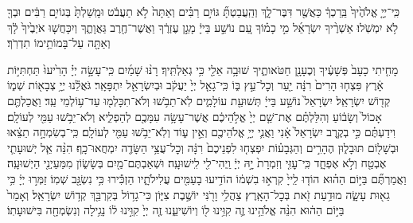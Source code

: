 \begin{footnotesize}
	כִּֽי־יְיָ֤ אֱלֹהֶ֙יךָ֙ בֵּֽרַכְךָ֔ כַּאֲשֶׁ֖ר דִּבֶּר־לָ֑ךְ וְהַֽעֲבַטְתָּ֞ גּוֹיִ֣ם רַבִּ֗ים וְאַתָּה֙ לֹ֣א תַעֲבֹ֔ט וּמָֽשַׁלְתָּ֙ בְּגוֹיִ֣ם רַבִּ֔ים וּבְךָ֖ לֹ֥א יִמְשֹֽׁלוּ׃
	אַשְׁרֶ֨יךָ‏ יִשְׂרָאֵ֜ל מִ֣י כָמ֗וֹךָ עַ֚ם נוֹשַׁ֣ע בַּייָ֔ מָגֵ֣ן עֶזְרֶ֔ךָ וַאֲשֶׁר־חֶ֖רֶב גַּאֲוָתֶ֑ךָ וְיִכָּחֲשׁ֤וּ אֹיְבֶ֙יךָ֙ לָ֔ךְ וְאַתָּ֖ה עַל־בָּמוֹתֵ֥ימוֹ תִדְרֹֽךְ׃
	
	מָחִ֤יתִי כָעָב֙ פְּשָׁעֶ֔יךָ וְכֶעָנָ֖ן חַטֹּאותֶ֑יךָ שׁוּבָ֥ה אֵלַ֖י כִּ֥י גְאַלְתִּֽיךָ׃ רָנּ֨וּ שָׁמַ֜יִם כִּֽי־עָשָׂ֣ה יְיָ֗ הָרִ֙יעוּ֙ תַּחְתִּיּ֣וֹת אָ֔רֶץ פִּצְח֤וּ הָרִים֙ רִנָּ֔ה יַ֖עַר וְכׇל־עֵ֣ץ בּ֑וֹ כִּֽי־גָאַ֤ל יְיָ֙ יַעֲקֹ֔ב וּבְיִשְׂרָאֵ֖ל יִתְפָּאָֽר׃
	גֹּאֲלֵ֕נוּ יְיָ֥ צְבָא֖וֹת שְׁמ֑וֹ קְד֖וֹשׁ יִשְׂרָאֵֽל׃
	יִשְׂרָאֵל֙ נוֹשַׁ֣ע בַּייָ֔ תְּשׁוּעַ֖ת עוֹלָמִ֑ים לֹֽא־תֵבֹ֥שׁוּ וְלֹא־תִכָּלְמ֖וּ עַד־ע֥וֹלְמֵי עַֽד׃
	וַאֲכַלְתֶּ֤ם אָכוֹל֙ וְשָׂב֔וֹעַ וְהִלַּלְתֶּ֗ם אֶת־שֵׁ֤ם יְיָ֙ אֱלֹ֣הֵיכֶ֔ם אֲשֶׁר־עָשָׂ֥ה עִמָּכֶ֖ם לְהַפְלִ֑יא וְלֹא־יֵבֹ֥שׁוּ עַמִּ֖י לְעוֹלָֽם׃ וִידַעְתֶּ֗ם כִּ֣י בְקֶ֤רֶב יִשְׂרָאֵל֙ אָ֔נִי וַאֲנִ֛י יְיָ֥ אֱלֹהֵיכֶ֖ם וְאֵ֣ין ע֑וֹד וְלֹֽא־יֵבֹ֥שׁוּ עַמִּ֖י לְעוֹלָֽם׃
	כִּֽי־בְשִׂמְחָ֣ה תֵצֵ֔אוּ וּבְשָׁל֖וֹם תּוּבָל֑וּן הֶהָרִ֣ים וְהַגְּבָע֗וֹת יִפְצְח֤וּ לִפְנֵיכֶם֙ רִנָּ֔ה וְכׇל־עֲצֵ֥י הַשָּׂדֶ֖ה יִמְחֲאוּ־כָֽף׃
	הִנֵּ֨ה אֵ֧ל יְשׁוּעָתִ֛י אֶבְטַ֖ח וְלֹ֣א אֶפְחָ֑ד כִּֽי־עׇזִּ֤י וְזִמְרָת֙ יָ֣הּ יְיָ֔ וַֽיְהִי־לִ֖י לִֽישׁוּעָֽה׃ וּשְׁאַבְתֶּם־מַ֖יִם בְּשָׂשׂ֑וֹן מִמַּעַיְנֵ֖י הַיְשׁוּעָֽה׃ וַאֲמַרְתֶּ֞ם בַּיּ֣וֹם הַה֗וּא הוֹד֤וּ לַֽייָ֙ קִרְא֣וּ בִשְׁמ֔וֹ הוֹדִ֥יעוּ בָעַמִּ֖ים עֲלִילֹתָ֑יו הַזְכִּ֕ירוּ כִּ֥י נִשְׂגָּ֖ב שְׁמֽוֹ׃ זַמְּר֣וּ יְיָ֔ כִּ֥י גֵא֖וּת עָשָׂ֑ה מוּדַ֥עַת זֹ֖את בְּכׇל־הָאָֽרֶץ׃ צַהֲלִ֥י וָרֹ֖נִּי יוֹשֶׁ֣בֶת צִיּ֑וֹן כִּי־גָד֥וֹל בְּקִרְבֵּ֖ךְ קְד֥וֹשׁ יִשְׂרָאֵֽל׃
	וְאָמַר֙ בַּיּ֣וֹם הַה֔וּא הִנֵּ֨ה אֱלֹהֵ֥ינוּ זֶ֛ה קִוִּ֥ינוּ ל֖וֹ וְיוֹשִׁיעֵ֑נוּ זֶ֤ה יְיָ֙ קִוִּ֣ינוּ ל֔וֹ נָגִ֥ילָה וְנִשְׂמְחָ֖ה בִּישׁוּעָתֽוֹ׃
	

\end{footnotesize}
